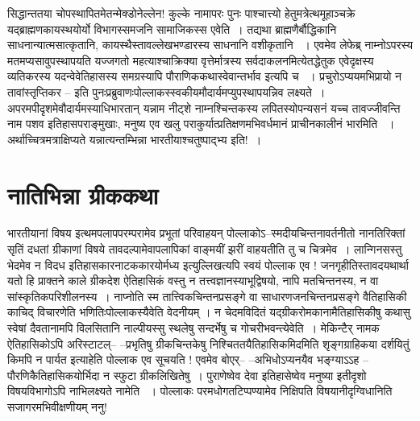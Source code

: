 सिद्धान्ततया चोपस्थापितमेतन्मेक्डोनेल्लेन! कुल्के  नामापरः पुनः पाश्चात्त्यो हेतुमत्रेत्थमूहाञ्चक्रे यद्ब्राह्मणकायस्थयोर्यो विभागस्समजनि सामाजिकस्स एवेति~। तद्यथा ब्राह्मणैर्बौद्धिकानि साधनान्यात्मसात्कृतानि, कायस्थैस्तावल्लेखभण्डारस्य  साधनानि वशीकृतानि ~। एवमेव लेफेब्र्  नाम्नोऽपरस्य मतमप्यसावुपस्थापयति यज्जगतो महत्याश्चाक्रिक्या वृत्तेर्मात्रस्य सर्वदाकलनमित्येतद्धेतुक एवेदृक्षस्य व्यतिकरस्य यदन्वेवेतिहासस्य समग्रस्यापि पौराणिककथास्वेवान्तर्भाव इत्यपि च ~। प्रचुरोऽप्ययमभिप्रायो न तावांस्तृप्तिकर – इति पुनःप्रब्रुवाणःपोल्लाकस्स्वकीयमौदार्यमप्युपस्थापयन्निव लक्ष्यते~। अपरमपीदृशमेवौदार्यमस्याधिभारतान् यन्नाम नीट्शे नाम्नश्चिन्तकस्य लपितस्योपन्यसनं यच्च तावज्जीवन्ति नाम पशव इतिहासपराङ्मुखाः, मनुष्य एव खलु पराकुर्यात्प्रतिक्षणमभिवर्धमानं प्राचीनकालीनं भारमिति ~। अर्थाच्चित्रमत्राक्षिप्यते यन्नात्यन्तम्भिन्ना भारतीयाश्चतुष्पाद्भ्य इति!~।


\section*{नातिभिन्ना ग्रीककथा}

भारतीयानां विषय इत्थमपलापपरम्परामेव प्रभूतां परिवाहयन् पोल्लाकोऽ–स्मदीयचिन्तनावर्तनीतो नानतिरिक्तां सृतिं दधतां ग्रीकाणां विषये तावदल्पामेवापलापिकां वाङ्मयीं झरीं वाहयतीति तु च चित्रमेव~। लान्गिनसस्तु  भेदमेव न विदध इतिहासकारनाटककारयोर्मध्य इत्युल्लिखत्यपि स्वयं पोल्लाक एव ! जनगृहीतिस्तावदयथार्था यतो हि प्राक्तने काले ग्रीकदेश ऐतिहासिकं वस्तु न तत्त्वज्ञानस्याभूद्विषयो, नापि मतचिन्तनस्य, न वा सांस्कृतिकपरिशीलनस्य~। नाप्नोति स्म तात्त्विकचिन्तनप्रसङ्गे वा साधारणजनचिन्तनप्रसङ्गे वैतिहासिकी काचिद् विचारणेति भणितिःपोल्लाकस्यैवेति वेदनीयम् । न चेदमविदितं यद्ग्रीकरोमकानामैतिहासिकीषु कथासु स्वेषां दैवतानामपि विलसितानि नाल्पीयस्सु स्थलेषु सन्दर्भेषु च गोचरीभवन्त्येवेति~। मेकिन्टैर् नामक ऐतिहासिकोऽपि अरिस्टाटल्– –प्रभृतिषु ग्रीकचिन्तकेषु निश्चिततयैतिहासिकमिदमिति शृङ्गग्राहिकया दर्शयितुं किमपि न पार्यत इत्याहेति पोल्लाक एव सूचयति ! एवमेव बोएर्– –अभिधोऽप्यनयैव भङ्ग्याऽऽह – पौरणिकैतिहासिकयोर्भिदा न स्फुटा ग्रीकलिखितेषु~। पुराणेष्वेव देवा इतिहासेष्वेव मनुष्या इतीदृशो विषयविभागोऽपि नाभिलक्ष्यते नामेति ~। पोल्लाकः परमधोगतटिप्पण्यामेव निक्षिपति विषयानीदृग्विधानिति सजागरमभिवीक्षणीयम् ननु!

